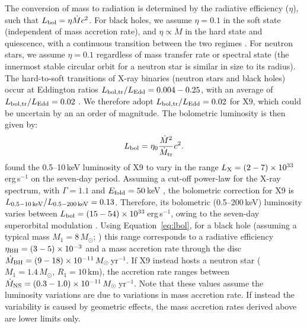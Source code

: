 \documentclass[a4paper,fleqn,usenatbib]{mnras}
\begin{document}
The conversion of mass to radiation is determined by the radiative efficiency ($\eta$), such that $L_{\rm bol} = \eta \dot{M} c^2$. For black holes, we assume $\eta = 0.1$ in the soft state (independent of mass accretion rate), and $\eta \propto \dot{M}$ in the hard state and quiescence, with a continuous transition between the two regimes \citep{2008NewAR..51..733N}. For neutron stars, we assume $\eta = 0.1$ regardless of mass transfer rate or spectral state (the innermost stable circular orbit for a neutron star is similar in size to its radius). The hard-to-soft transitions of X-ray binaries (neutron stars and black holes) occur at Eddington ratios $L_{\rm bol,tr}/L_{\rm Edd} = 0.004 - 0.25$, with an average of $L_{\rm bol,tr}/L_{\rm Edd} = 0.02$ \citep{2003A&A...409..697M, 2013ApJ...779...95K}. We therefore adopt $L_{\rm bol,tr}/L_{\rm Edd} = 0.02$ for X9, which could be uncertain by an an order of magnitude. The bolometric luminosity is then given by:
\begin{equation}
\label{eq:lbol}
L_{\rm bol} = \eta_0 \frac{\dot{M}^2}{\dot{M}_{\rm tr}} c^2.
\end{equation}
\citet{2017MNRAS.467.2199B} found the 0.5--10\,keV luminosity of X9 to vary in the range $L_{\rm X} = (2-7) \times 10^{33}$\,erg\,s$^{-1}$ on the seven-day period. Assuming a cut-off power-law for the X-ray spectrum, with $\Gamma = 1.1$ and $E_{\rm fold} = 50$\,keV \citep{2017MNRAS.467.2199B}, the bolometric correction for X9 is $L_{\rm 0.5-10\,keV}/L_{\rm 0.5-200\,keV} = 0.13$. Therefore, its bolometric (0.5--200\,keV) luminosity varies between $L_{\rm bol} = (15-54)\times 10^{33}$\,erg\,s$^{-1}$, owing to the seven-day superorbital modulation \citep{2017MNRAS.467.2199B}. Using Equation~\ref{eq:lbol}, for a black hole (assuming a typical mass $M_1 = 8\,M_\odot$; \citealp{2010ApJ...725.1918O}) this range corresponds to a radiative efficiency $\eta_{\rm BH} = (3-5)\times 10^{-3}$ and a mass accretion rate through the disc $\dot{M}_{\rm BH} = (9-18) \times 10^{-11}\,M_\odot$\,yr$^{-1}$. If X9 instead hosts a neutron star ($M_1 = 1.4\,M_\odot$, $R_1 = 10$\,km), the accretion rate ranges between $\dot{M}_{\rm NS} = (0.3-1.0) \times 10^{-11}\,M_\odot$\,yr$^{-1}$. Note that these values assume the luminosity variations are due to variations in mass accretion rate. If instead the variability is caused by geometric effects, the mass accretion rates derived above are lower limits only.
\end{document}

